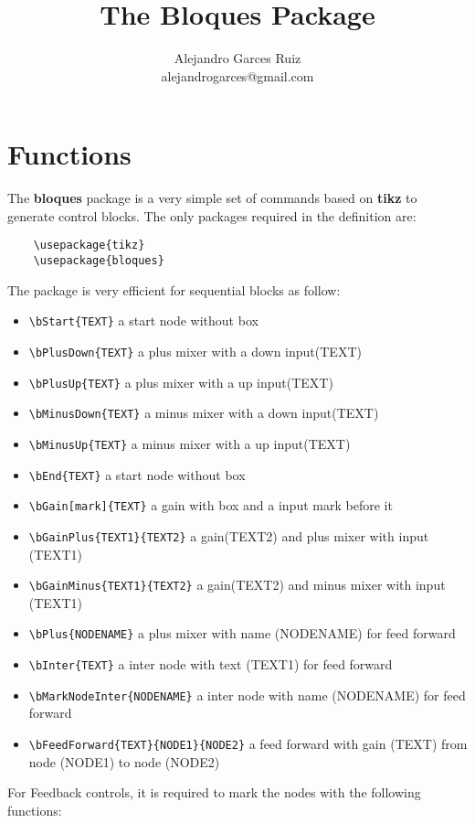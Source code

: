 \documentclass[a4paper,onecolumn]{IEEETran}
\title{The Bloques Package}
\author{Alejandro Garces Ruiz \\ alejandrogarces@gmail.com}
\begin{document}
\maketitle

\section{Functions}


The \textbf{bloques} package is a very simple set of commands based on \textbf{tikz} to generate control blocks.  The only packages required in the definition are:

\begin{verbatim}
	\usepackage{tikz}
	\usepackage{bloques}
\end{verbatim}

The package is very efficient for sequential blocks as follow:

\begin{itemize}
\item \verb|\bStart{TEXT}| a start node without box
\item \verb|\bPlusDown{TEXT}| a plus mixer with a down input(TEXT) 
\item \verb|\bPlusUp{TEXT}|   a plus mixer with a up input(TEXT) 
\item \verb|\bMinusDown{TEXT}| a minus mixer with a down input(TEXT) 
\item \verb|\bMinusUp{TEXT}| a minus mixer with a up input(TEXT) 
\item \verb|\bEnd{TEXT}| a start node without box
\item \verb|\bGain[mark]{TEXT}| a gain with box and a input mark before it
\item \verb|\bGainPlus{TEXT1}{TEXT2}| a gain(TEXT2) and plus mixer with input (TEXT1)
\item \verb|\bGainMinus{TEXT1}{TEXT2}| a gain(TEXT2) and minus mixer with input (TEXT1)
\item \verb|\bPlus{NODENAME}| a plus mixer with name (NODENAME) for feed forward
\item \verb|\bInter{TEXT}| a inter node with text (TEXT1) for feed forward
\item \verb|\bMarkNodeInter{NODENAME}| a inter node with name (NODENAME)  for feed forward
\item \verb|\bFeedForward{TEXT}{NODE1}{NODE2}| a feed forward with gain (TEXT) from node (NODE1) to node (NODE2)
\end{itemize}

For Feedback controls, it is required to mark the nodes with the following functions:
\end{document}
